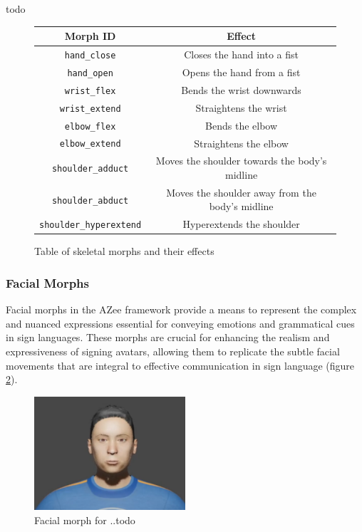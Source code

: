 \documentclass[../../main.tex]{subfiles}
\begin{document}
todo
\begin{figure}
    \centering
    \begin{tabular}{|c|c|}
        \hline
        \textbf{Morph ID} & \textbf{Effect} \\
        \hline
        \texttt{hand\_close} & Closes the hand into a fist \\
        \texttt{hand\_open} & Opens the hand from a fist \\
        \texttt{wrist\_flex} & Bends the wrist downwards \\
        \texttt{wrist\_extend} & Straightens the wrist \\
        \texttt{elbow\_flex} & Bends the elbow \\
        \texttt{elbow\_extend} & Straightens the elbow \\
        \texttt{shoulder\_adduct} & Moves the shoulder towards the body's midline \\
        \texttt{shoulder\_abduct} & Moves the shoulder away from the body's midline \\
        \texttt{shoulder\_hyperextend} & Hyperextends the shoulder \\
        \hline
    \end{tabular}
    \caption{Table of skeletal morphs and their effects}
    \label{fig:skeletal_morphs}
\end{figure}

\subsubsection{Facial Morphs}
\label{ch:rigging_layers:proc_rig_signing_avatars:morph_constraints:facial_morphs}

Facial morphs in the AZee framework provide a means to represent the complex and nuanced expressions essential for conveying emotions and grammatical cues in sign languages. These morphs are crucial for enhancing the realism and expressiveness of signing avatars, allowing them to replicate the subtle facial movements that are integral to effective communication in sign language (figure \ref{fig:facial_example}).

\begin{figure}
    \centering
    \includegraphics[width=0.5\textwidth]{chapters/rigging_layers/images/facial_example.png}
    \caption{Facial morph for ..todo}
    \label{fig:facial_example}
\end{figure}
\end{document}
